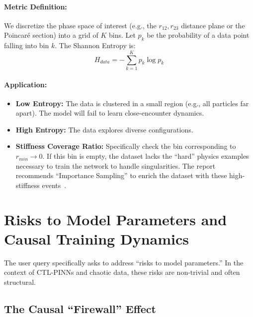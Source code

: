 \documentclass[11pt, a4paper]{article}
\begin{document}
\paragraph{Metric Definition:}
We discretize the phase space of interest (e.g., the $r_{12}, r_{23}$ distance plane or the Poincaré section) into a grid of $K$ bins. Let $p_k$ be the probability of a data point falling into bin $k$. The Shannon Entropy is:
\begin{equation}
    H_{data} = - \sum_{k=1}^{K} p_k \log p_k
\end{equation}

\paragraph{Application:}
\begin{itemize}
    \item \textbf{Low Entropy:} The data is clustered in a small region (e.g., all particles far apart). The model will fail to learn close-encounter dynamics.
    \item \textbf{High Entropy:} The data explores diverse configurations.
    \item \textbf{Stiffness Coverage Ratio:} Specifically check the bin corresponding to $r_{min} \to 0$. If this bin is empty, the dataset lacks the ``hard'' physics examples necessary to train the network to handle singularities. The report recommends ``Importance Sampling'' to enrich the dataset with these high-stiffness events~\cite{ref9}.
\end{itemize}

\section{Risks to Model Parameters and Causal Training Dynamics}

The user query specifically asks to address ``risks to model parameters.'' In the context of CTL-PINNs and chaotic data, these risks are non-trivial and often structural.

\subsection{The Causal ``Firewall'' Effect}
\end{document}
